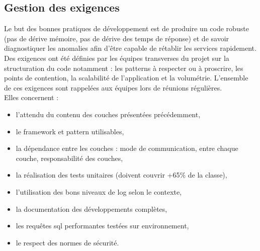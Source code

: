 \documentclass[12pt,a4paper]{article}
\begin{document}
\subsection{Gestion des exigences}
Le but des bonnes pratiques de développement est de produire un code robuste (pas de dérive mémoire, pas de dérive des temps de réponse) et de savoir diagnostiquer les anomalies  afin d'être capable de rétablir les services rapidement.\\
Des exigences ont été définies par les équipes transverses du projet sur la structuration du code notamment : les patterns à respecter ou à proscrire, les points de contention, la scalabilité de l'application et la volumétrie. L'ensemble de ces exigences sont rappelées aux équipes lors de réunions régulières.\\ Elles concernent :
\smallbreak
\begin{itemize}	
\item l'attendu du contenu des couches présentées précédemment,
\item le framework et pattern utilisables,
\item la dépendance entre les couches : mode de communication, entre chaque couche, responsabilité des couches,
\item la réalisation des tests unitaires (doivent couvrir +65\% de la classe),
\item l'utilisation des bons niveaux de log selon le contexte,
\item la documentation des développements complètes,
\item les requêtes sql performantes testées sur environnement,
\item le respect des normes de sécurité.
\end{itemize}
\medbreak
\end{document}
